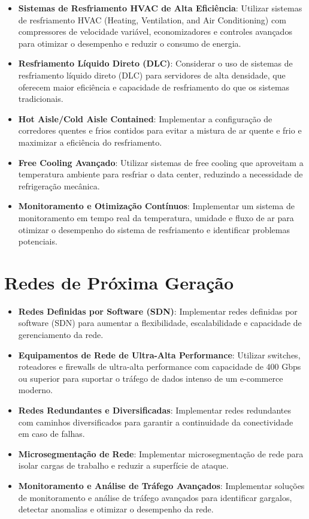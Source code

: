 \documentclass[
	12pt,				%
	oneside,			%
	a4paper,			%
	english,			%
	brazil				%
	]{abntex2unama}
\begin{document}
\begin{itemize}
	\item \textbf{Sistemas de Resfriamento HVAC de Alta Eficiência}: Utilizar sistemas de resfriamento HVAC (Heating, Ventilation, and Air Conditioning) com compressores de velocidade variável, economizadores e controles avançados para otimizar o desempenho e reduzir o consumo de energia.
	\item \textbf{Resfriamento Líquido Direto (DLC)}: Considerar o uso de sistemas de resfriamento líquido direto (DLC) para servidores de alta densidade, que oferecem maior eficiência e capacidade de resfriamento do que os sistemas tradicionais.
	\item \textbf{Hot Aisle/Cold Aisle Contained}: Implementar a configuração de corredores quentes e frios contidos para evitar a mistura de ar quente e frio e maximizar a eficiência do resfriamento.
	\item \textbf{Free Cooling Avançado}: Utilizar sistemas de free cooling que aproveitam a temperatura ambiente para resfriar o data center, reduzindo a necessidade de refrigeração mecânica.
	\item \textbf{Monitoramento e Otimização Contínuos}: Implementar um sistema de monitoramento em tempo real da temperatura, umidade e fluxo de ar para otimizar o desempenho do sistema de resfriamento e identificar problemas potenciais.
\end{itemize}

\section{Redes de Próxima Geração}

\begin{itemize}
	\item \textbf{Redes Definidas por Software (SDN)}: Implementar redes definidas por software (SDN) para aumentar a flexibilidade, escalabilidade e capacidade de gerenciamento da rede.
	\item \textbf{Equipamentos de Rede de Ultra-Alta Performance}: Utilizar switches, roteadores e firewalls de ultra-alta performance com capacidade de 400 Gbps ou superior para suportar o tráfego de dados intenso de um e-commerce moderno.
	\item \textbf{Redes Redundantes e Diversificadas}: Implementar redes redundantes com caminhos diversificados para garantir a continuidade da conectividade em caso de falhas.
	\item \textbf{Microsegmentação de Rede}: Implementar microsegmentação de rede para isolar cargas de trabalho e reduzir a superfície de ataque.
	\item \textbf{Monitoramento e Análise de Tráfego Avançados}: Implementar soluções de monitoramento e análise de tráfego avançados para identificar gargalos, detectar anomalias e otimizar o desempenho da rede.
\end{itemize}
\end{document}
